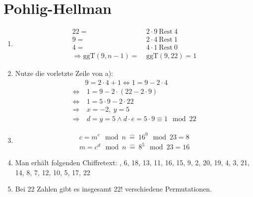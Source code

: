 \documentclass[DIN, pagenumber=false, fontsize=11pt, parskip=half]{scrartcl}
\newcommand{\ggt}{\text{ggT}}
\newcommand{\rem}{\ \text{Rest} \ }
\newcommand{\congTo}[2]{\equiv #1\mod #2}
\begin{document}
    \section{Pohlig-Hellman}
    \begin{enumerate}[label=\alph*)]
        \item 
        \begin{align*}
            22 =& ~2 \cdot 9 \rem 4 \\
            9 =& ~2 \cdot 4 \rem 1 \\
            4 =& ~4 \cdot 1 \rem 0 \\
            \Rightarrow \ggt(9, n-1) =& ~\ggt(9, 22) = 1
        \end{align*}
        \item Nutze die vorletzte Zeile von a):
        \begin{align*}
            &9 = 2 \cdot 4 + 1 \Leftrightarrow 1 = 9 - 2 \cdot 4 \\
            \Leftrightarrow& ~1 = 9 - 2 \cdot (22 - 2 \cdot 9) \\
            \Leftrightarrow& ~1 = 5 \cdot 9 - 2 \cdot 22 \\
            \Rightarrow& ~x = -2, ~y = 5 \\
            \Rightarrow& ~d = y = 5 \wedge d \cdot e = 5 \cdot 9 \congTo{1}{22}
        \end{align*}
        \item 
        \begin{align*}
            c = m^e \mod n ~\hat{=}~ 16^9 \mod 23 = 8 \\
            m = c^d \mod n ~\hat{=}~ 8^5 \mod 23 = 16
        \end{align*}
        \item Man erhält folgenden Chiffretext: , 6, 18, 13, 11, 16, 15, 9, 2, 20, 19, 4, 3, 21, 14, 8, 7, 12, 10, 5, 17, 22
        \item Bei 22 Zahlen gibt es insgesamt 22! verschiedene Permutationen.
    \end{enumerate}
\end{document}
